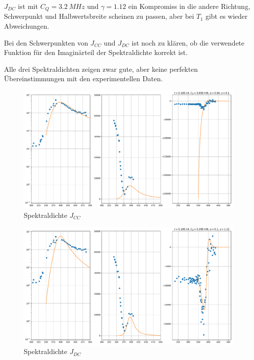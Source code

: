 $J_{DC}$ ist mit $C_Q = \SI{3.2}{MHz}$ und $\gamma = 1.12$ ein Kompromiss in die andere Richtung, Schwerpunkt und Halbwertsbreite scheinen zu passen, aber bei $T_1$ gibt es wieder Abweichungen. 

Bei den Schwerpunkten von $J_{CC}$ und $J_{DC}$ ist noch zu klären, ob die verwendete Funktion für den Imaginärteil der Spektraldichte korrekt ist.

Alle drei Spektraldichten zeigen zwar gute, aber keine perfekten Übereinstimmungen mit den experimentellen Daten.



\begin{figure}
	\begin{center}
		\includegraphics[width=\textwidth]{graphics/plots/THEO/J_cc_02.pdf}
	\end{center}
	\caption{Spektraldichte $J_{CC}$} \label{fig:res:theorie_j_cc}
\end{figure}

\begin{figure}
	\begin{center}
		\includegraphics[width=\textwidth]{graphics/plots/THEO/J_dc_01.pdf}
	\end{center}
	\caption{Spektraldichte $J_{DC}$} \label{fig:res:theorie_j_dc}
\end{figure}



